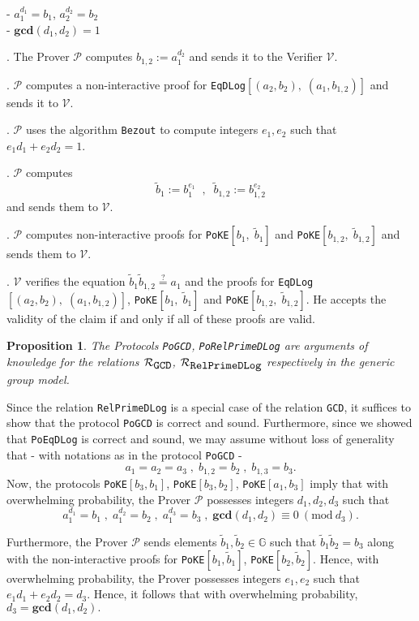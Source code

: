\documentclass[11pt, lettersize, notitlepage, leqno, footskip=0.6cm]{article}
\newcommand{\wti}{\widetilde}
\newcommand{\mc}{\mathcal}
\newcommand{\mb}{\mathbb}
\newcommand{\mbf}{\mathbf}
\newcommand{\mP}{\mc{P}}
\newcommand{\V}{\mc{V}}
\newcommand{\vs}{\vspace{-0.15cm}}
\newcommand{\noin}{\noindent}
\newcommand{\op}{overwhelming probability}
\newcommand{\Mod}[1]{\ (\mathrm{mod}\ #1)}
\newcommand{\GCD}{\mbf{gcd}}
\newtheorem{Prop}[Thm]{Proposition}
\numberwithin{equation}{section}
\begin{document}
\noindent - $a_1^{d_1} = b_1$, $a_2^{d_2} = b_2$\\
\noindent - $\GCD(d_1, d_2) = 1$
 

\begin{prf1} . The Prover $\mc{P}$ computes $b_{1,2}:= a_1^{d_2}$ and sends it to the Verifier $\V$. 

. $\mP$ computes a non-interactive proof for \verb|EqDLog|$[(a_2, b_2),\; (a_1, b_{1,2})]$ and sends it to $\mc{V}$.

. $\mc{P}$ uses the algorithm \verb|Bezout|  to compute integers $e_1, e_2$ such that $e_1d_1 + e_2d_2 = 1$.

\noin 4. $\mc{P}$ computes \vs $$\wti{b}_1:= b_1^{e_1}\;\;,\;\; \wti{b}_{1,2}:= b_{1,2}^{e_2} $$ and sends them to $\V$. 

\noin 5. $\mP$ computes non-interactive proofs for \verb|PoKE|$[b_1,\; \wti{b}_1]$ and \verb|PoKE|$[b_{1,2},\; \wti{b}_{1,2}]$ and sends them to $\mc{V}$.

. $\mc{V}$ verifies the equation $\wti{b}_1\wti{b}_{1,2}\stackrel{?}{=} a_1$ and the proofs for \verb|EqDLog|$[(a_2, b_2),\; (a_1, b_{1,2})]$, \verb|PoKE|$[b_1,\; \wti{b}_1]$ and \verb|PoKE|$[b_{1,2},\; \wti{b}_{1,2}]$. He accepts the validity of the claim if and only if all of these proofs are valid.\end{prf1}

\vspace{0.2cm}

\begin{Prop} The Protocols \verb|PoGCD|, \verb|PoRelPrimeDLog| are arguments of knowledge for the relations $\mc{R}_{{\protect\verb|GCD|}}$, $\mc{R}_{{\protect\verb|RelPrimeDLog|}}$ respectively in the generic group model.\end{Prop}

\begin{prf} Since the relation \verb|RelPrimeDLog| is a special case of the relation \verb|GCD|, it suffices to show that the protocol \verb|PoGCD| is correct and sound. Furthermore, since we showed that \verb|PoEqDLog| is correct and sound, we may assume without loss of generality that - with notations as in the protocol \verb|PoGCD| - \vs $$a_1 = a_2 = a_3\;,\; {b}_{1,2} = b_2\;,\;{b}_{1,3} = b_3 .$$ Now, the protocols \verb|PoKE|$[b_3, b_1]$, \verb|PoKE|$[b_3, b_2]$, \verb|PoKE|$[a_1, b_3]$ imply that with \op, the Prover $\mP$ possesses integers $d_1,d_2,d_3$ such that \vs $$a_1^{d_1} = b_1\;,\;a_1^{d_2} = b_2\;,\;a_1^{d_3} = b_3\;,\;\GCD(d_1,d_2)\equiv 0\Mod{d_3}.$$ 

Furthermore, the Prover $\mP$ sends elements $\wti{b}_1, \wti{b}_2\in \mb{G}$ such that $\wti{b}_1\wti{b}_2 = b_3$ along with the non-interactive proofs for \verb|PoKE|$[b_1,\wti{b}_1]$, \verb|PoKE|$[b_2,\wti{b}_2]$. Hence, with \op, the Prover possesses integers $e_1,e_2$ such that $e_1d_1+e_2d_2 = d_3$. Hence, it follows that with \op, $d_3 = \GCD(d_1,d_2).$ 
\end{prf}
\end{document}
